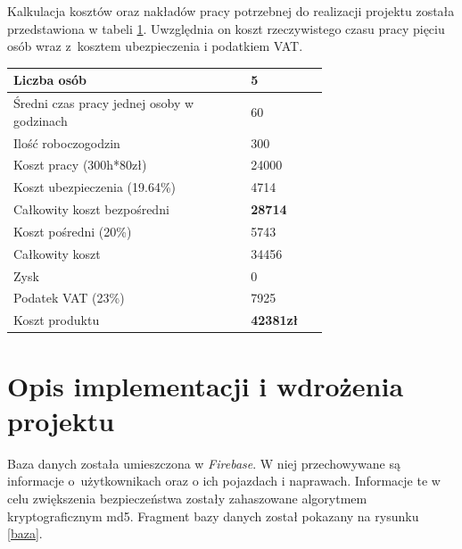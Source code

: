 \documentclass[12pt]{article}
\begin{document}
Kalkulacja kosztów oraz nakładów pracy potrzebnej do realizacji projektu została przedstawiona w tabeli \ref{kosztorys}. Uwzględnia on koszt rzeczywistego czasu pracy pięciu osób wraz z~kosztem ubezpieczenia i podatkiem VAT.

\begin{table}[H]
\begin{center}
\label{kosztorys}
	\begin{tabular}{|p{0.55\linewidth}|p{0.15\linewidth}|}%
	\hline
	Liczba osób 	& 5 				\\ \hline
	Średni czas pracy jednej osoby w godzinach		& 60\\ \hline
	Ilość roboczogodzin & 300	\\ \hline
	Koszt pracy (300h*80zł) & 24000	\\ \hline
	Koszt ubezpieczenia (19.64\%) & 4714	\\ \hline
	Całkowity koszt bezpośredni & \textbf{28714}	\\ \hline
	Koszt pośredni (20\%) & 5743\\ \hline
	Całkowity koszt & 34456\\ \hline
	Zysk & 0\\ \hline
	Podatek VAT (23\%) & 7925\\ \hline
							 \hline
	Koszt produktu & \textbf{42381zł}\\ \hline
	\end{tabular}
\end{center}
\end{table}


\newpage
\section{Opis implementacji i wdrożenia projektu}


Baza danych została umieszczona w \textit{Firebase}. W niej przechowywane są informacje o~użytkownikach oraz o ich pojazdach i naprawach. Informacje te w celu zwiększenia bezpieczeństwa zostały zahaszowane algorytmem kryptograficznym md5. Fragment bazy danych został pokazany na rysunku \ref{baza}.
\end{document}

